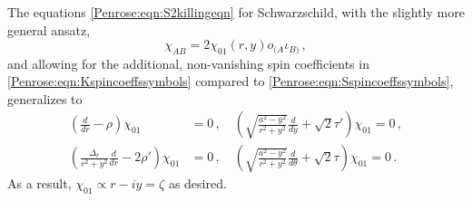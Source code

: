 The equations \eqref{Penrose:eqn:S2killingeqn} for Schwarzschild, with the slightly more general ansatz,
\begin{equation}\label{Penrose:eqn:Kchiansatz}
\chi_{AB} = 2 \chi_{01}(r,y) o_{(A} \iota_{B)} \, ,
\end{equation}
and allowing for the additional, non-vanishing spin coefficients in \eqref{Penrose:eqn:Kspincoeffssymbols} compared to \eqref{Penrose:eqn:Sspincoeffssymbols}, generalizes to
\begin{equation}\label{Penrose:eqn:K2killingeqn}
\begin{aligned}
\left(\frac{d}{dr} - \rho\right)\chi_{01} &= 0  \, , \quad \left(\sqrt{\frac{a^2-y^2}{r^2+y^2}}\frac{d}{dy} + \sqrt{2} \tau'\right)\chi_{01} = 0 
\, , \\ \left(\frac{\Delta_r}{r^2+y^2}\frac{d}{dr} - 2\rho'\right)\chi_{01} &= 0   \, , \quad 
\left(\sqrt{\frac{a^2-y^2}{r^2+y^2}}\frac{d}{d\theta} + \sqrt{2} \tau\right)\chi_{01} = 0 \, .
\end{aligned}
\end{equation}
As a result, $\chi_{01} \propto r-iy = \zeta$ as desired.

